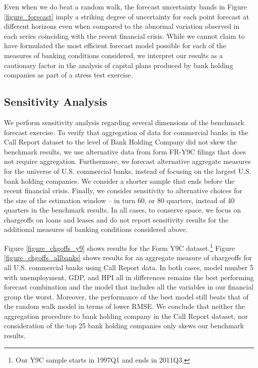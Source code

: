 \documentclass[12pt]{article}
\begin{document}
Even when we do beat a random walk, the forecast uncertainty bands
in Figure \ref{figure_forecast} imply a striking degree of
uncertainty for each point forecast at different horizons even
when compared to the abnormal variation observed in each series
coinciding with the recent financial crisis. While we cannot claim
to have formulated the most efficient forecast model possible for
each of the measures of banking conditions considered, we
interpret our results as a cautionary factor in the analysis of
capital plans produced by bank holding companies as part of a
stress test exercise.


\subsection{Sensitivity Analysis}

We perform sensitivity analysis regarding several dimensions of
the benchmark forecast exercise. To verify that aggregation of
data for commercial banks in the Call Report dataset to the level
of Bank Holding Company did not skew the benchmark results, we use
alternative data from form FR-Y9C filings that does not require
aggregation. Furthermore, we forecast alternative aggregate
measures for the universe of U.S. commercial banks, instead of
focusing on the largest U.S. bank holding companies.  We consider
a shorter sample that ends before the recent financial crisis.
Finally, we consider sensitivity to alternative choices for the
size of the estimation window -- in turn 60, or 80 quarters,
instead of 40 quarters in the benchmark results. In all cases, to
conserve space, we focus on chargeoffs on loans and leases and do
not report sensitivity results for the additional measures of
banking conditions considered above.

Figure \ref{figure_chgoffs_y9} shows results for the Form Y9C
dataset.\footnote{Our Y9C sample starts in 1997Q1 and ends in
2011Q3.} Figure \ref{figure_chgoffs_allbanks} shows results for an
aggregate measure of chargeoffs for all U.S. commercial banks
using Call Report data. In both cases, model number 5 with
unemployment, GDP, and HPI all in differences remains the best
performing forecast combination and the model that includes all
the variables in our financial group the worst. Moreover, the
performance of the best model still beats that of the random walk
model in terms of lower RMSE. We conclude that neither the
aggregation procedure to bank holding company in the Call Report
dataset, nor consideration of the top 25 bank holding companies
only skews our benchmark results.
\end{document}
